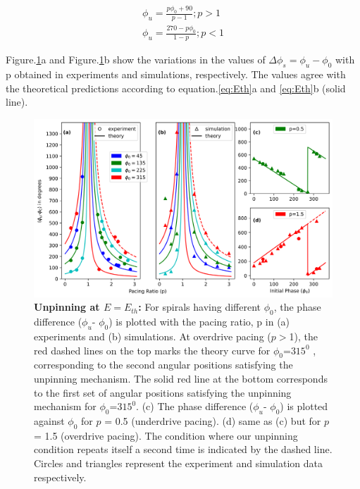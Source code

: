 \documentclass[%
 preprint,
 amsmath,amssymb,
 aps,
]{revtex4-2}
\begin{document}
\begin{subequations}
\begin{align}
\phi_u = \frac{p \phi_0+ 90}{p-1} ; p>1 \\
\phi_u = \frac{270-p \phi_0}{1-p} ; p<1  
\end{align}
\label{eq:Eth}
\end{subequations}

Figure.\ref{fig:unpinning_Eth}a and Figure.\ref{fig:unpinning_Eth}b show the variations in the values of $\Delta\phi_s = \phi_u - \phi_0$ with p obtained in experiments and simulations, respectively. The values agree with the theoretical predictions according to equation.\ref{eq:Eth}a and \ref{eq:Eth}b (solid line). 

\begin{figure}[H]
    \centering
    \includegraphics[scale=0.7]{Fig2.png}
    \caption{\textbf{Unpinning at $E = E_{th}$:} For spirals having different ${\phi}_0$,  the phase difference (${\phi}_u$- ${\phi}_0$) is plotted with the pacing ratio, p in (a) experiments and (b) simulations. At overdrive pacing ($p>$1), the red dashed lines on the top marks the theory curve for ${\phi}_0$=$315^0$ , corresponding to the second angular positions satisfying the unpinning mechanism. The solid red line at the bottom corresponds to the first set of angular positions satisfying the unpinning mechanism for ${\phi}_0$=$315^0$.
    (c) The phase difference (${\phi}_u$- ${\phi}_0$) is plotted against ${\phi}_0$ for $p$ = 0.5 (underdrive pacing). (d) same as (c) but for $p$ = 1.5 (overdrive pacing). The condition where our unpinning condition repeats itself a second time is indicated by the dashed line. Circles and triangles represent the experiment and simulation data respectively.  
    }
    \label{fig:unpinning_Eth}
\end{figure}
\end{document}
